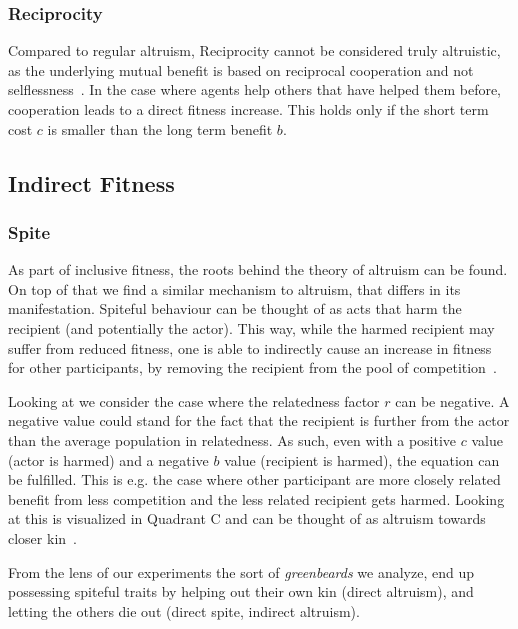 \documentclass[sigconf]{acmart}
\newcommand{\greenbeards}{\textit{greenbeards}\xspace}
\begin{document}
    \subsubsection{Reciprocity}\label{reciprocity}
    Compared to regular altruism, Reciprocity cannot be considered truly altruistic, as the underlying mutual benefit is based on reciprocal cooperation and not selflessness~\cite{triversEvolutionReciprocalAltruism1971}.
    In the case where agents help others that have helped them before, cooperation leads to a direct fitness increase.
    This holds only if the short term cost $c$ is smaller than the long term benefit $b$.

    \subsection{Indirect Fitness}\label{subsec:indirect_fitness}

    \subsubsection{Spite}
    As part of inclusive fitness, the roots behind the theory of altruism can be found.
    On top of that we find a similar mechanism to altruism, that differs in its manifestation.
    Spiteful behaviour can be thought of as acts that harm the recipient (and potentially the actor).
    This way, while the harmed recipient may suffer from reduced fitness, one is able to indirectly cause an increase in fitness for other participants, by removing the recipient from the pool of competition~\cite{hamiltonSelfishSpitefulBehaviour1970}.

    Looking at  we consider the case where the relatedness factor $r$ can be negative.
    A negative value could stand for the fact that the recipient is further from the actor than the average population in relatedness.
    As such, even with a positive $c$ value (actor is harmed) and a negative $b$ value (recipient is harmed), the equation can be fulfilled.
    This is e.g. the case where other participant are more closely related benefit from less competition and the less related recipient gets harmed.
    Looking at  this is visualized in Quadrant C and can be thought of as altruism towards closer kin~\cite{west_altruism_2010}.

    From the lens of our experiments the sort of \greenbeards we analyze, end up possessing spiteful traits by helping out their own kin (direct altruism), and letting the others die out (direct spite, indirect altruism).
\end{document}
